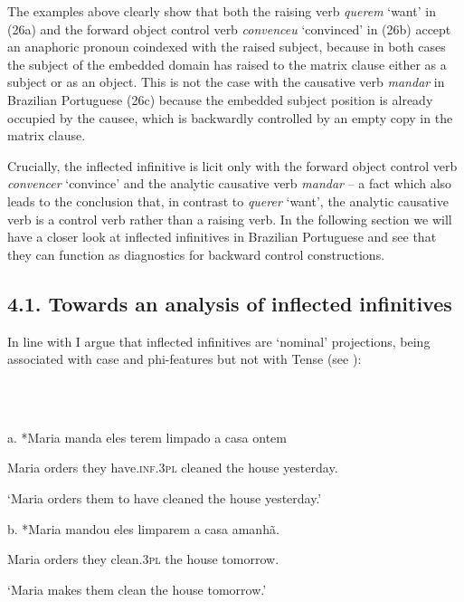 \documentclass[output=paper]{langsci/langscibook}
\begin{document}
The examples above clearly show that both the raising verb \textit{querem} ‘want’ in (26a) and the forward object control verb \textit{convenceu} ‘convinced’ in (26b) accept an anaphoric pronoun coindexed with the raised subject, because in both cases the subject of the embedded domain has raised to the matrix clause either as a subject or as an object. This is not the case with the causative verb \textit{mandar} in Brazilian Portuguese (26c) because the embedded subject position is already occupied by the causee, which is backwardly controlled by an empty copy in the matrix clause. 

Crucially, the inflected infinitive is licit only with the forward object control verb \textit{convencer} ‘convince’ and the analytic causative verb \textit{mandar} – a fact which also leads to the conclusion that, in contrast to \textit{querer} ‘want’, the analytic causative verb is a control verb rather than a raising verb. In the following section we will have a closer look at inflected infinitives in Brazilian Portuguese and see that they can function as diagnostics for backward control constructions.

\subsection{ 4.1. Towards an analysis of inflected infinitives}

In line with \citet{Raposo1987} I argue that inflected infinitives are ‘nominal’ projections, being associated with case and phi-features but not with Tense (see \citealt{Stowell1982}):

\ea%
    \label{ex:key:27}
    \gll\\
        \\
    \glt
    \z

          a.  *Maria manda   eles   terem        limpado a casa        ontem

    Maria  orders     they have.\textsc{inf.3pl} cleaned the house   yesterday.

    ‘Maria orders them to have cleaned the house yesterday.’

  b.  *Maria mandou eles limparem  a casa     amanhã.

    Maria   orders    they clean.\textsc{3pl} the house   tomorrow.

    ‘Maria makes them clean the house tomorrow.’
\end{document}
